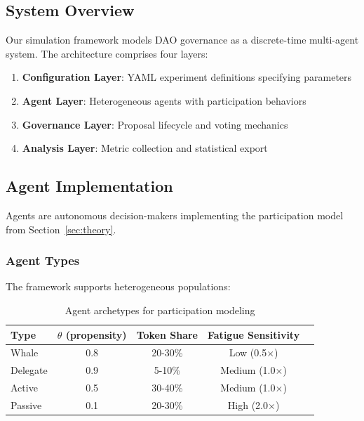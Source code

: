 
\subsection{System Overview}

Our simulation framework models DAO governance as a discrete-time multi-agent system. The architecture comprises four layers:

\begin{enumerate}
    \item \textbf{Configuration Layer}: YAML experiment definitions specifying parameters
    \item \textbf{Agent Layer}: Heterogeneous agents with participation behaviors
    \item \textbf{Governance Layer}: Proposal lifecycle and voting mechanics
    \item \textbf{Analysis Layer}: Metric collection and statistical export
\end{enumerate}

\subsection{Agent Implementation}

Agents are autonomous decision-makers implementing the participation model from Section~\ref{sec:theory}.

\subsubsection{Agent Types}

The framework supports heterogeneous populations:

\begin{table}[htbp]
\centering
\caption{Agent archetypes for participation modeling}
\label{tab:agent-types}
\begin{tabular}{lcccc}
\toprule
Type & $\theta$ (propensity) & Token Share & Fatigue Sensitivity \\
\midrule
Whale & 0.8 & 20-30\% & Low (0.5$\times$) \\
Delegate & 0.9 & 5-10\% & Medium (1.0$\times$) \\
Active & 0.5 & 30-40\% & Medium (1.0$\times$) \\
Passive & 0.1 & 20-30\% & High (2.0$\times$) \\
\bottomrule
\end{tabular}
\end{table}

